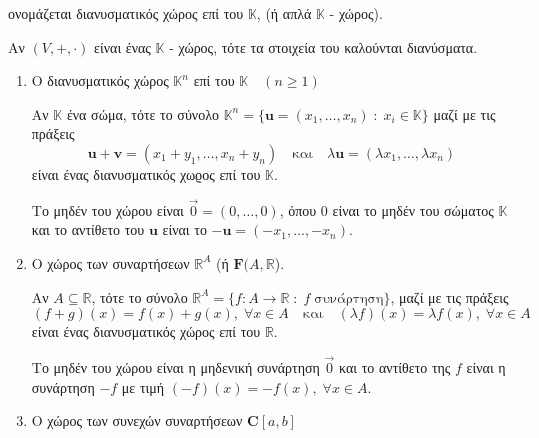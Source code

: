 \begin{dfn}
    ονομάζεται \textcolor{Col2}{διανυσματικός χώρος} επί του $\mathbb{K}$, 
    (ή απλά $ \mathbb{K} $ - χώρος).
\end{dfn}

\begin{dfn}
Αν $ (V,+,\cdot) $ είναι ένας $ \mathbb{K} $ - χώρος, τότε τα στοιχεία του καλούνται 
\textcolor{Col2}{διανύσματα}.
\end{dfn}


\begin{examples}
\item {}
    \begin{enumerate}
        \item \label{ex:Rn}\textcolor{Col2}{Ο διανυσματικός χώρος $ \mathbb{K}^{n} $ 
                επί του $ \mathbb{K} \quad (n \geq 1) $}

            Αν $ \mathbb{K} $ ένα σώμα, τότε το σύνολο $ \mathbb{K}^{n} = 
            \{ \mathbf{u} = (x_{1},\ldots,x_{n}) \; : \; x_{i} \in \mathbb{K}\} $ 
            μαζί με τις πράξεις 
            \[
                \mathbf{u}+ \mathbf{v} = (x_{1}+ y_{1}, \ldots , x_{n}+y_{n}) 
                \quad \text{και} \quad \lambda \mathbf{u} = 
                ( \lambda x_{1}, \ldots, \lambda x_{n})
            \]
            είναι ένας διανυσματικός χωϱος επί του $ \mathbb{K} $. 

            Το μηδέν του χώρου 
            είναι $ \vec{0} = (0,\ldots,0) $, όπου 0 είναι το μηδέν του σώματος 
            $ \mathbb{K} $ και το αντίθετο του $ \mathbf{u} $ είναι το $ - \mathbf{u} =
            (- x_{1}, \ldots, - x_{n}) $.

        \item\label{ex:funs} \textcolor{Col2}{Ο χώρος των συναρτήσεων $\mathbb{R} ^{A}$ 
            (ή $\mathbf{F}(A, \mathbb{R}$)}.

            Αν $ A \subseteq \mathbb{R} $, τότε το σύνολο $ \mathbb{R}^{A} = 
            \{ f \colon A \to \mathbb{R} \; : \; f \; \text{συνάρτηση} \} $, μαζί με 
            τις πράξεις
            \[
                (f+g)(x) = f(x) +g(x), \; \forall x \in A \quad \text{και} 
                \quad (\lambda f)(x)= \lambda f(x), \; \forall x \in A
            \] 
            είναι ένας διανυσματικός χώρος επί του $ \mathbb{R} $.

            Το μηδέν του χώρου είναι η μηδενική συνάρτηση $ \vec{0} $ και το 
            αντίθετο της $f$ είναι η συνάρτηση $ -f $ με τιμή $ (-f)(x) = 
            - f(x), \; \forall x \in A $.

        \item \textcolor{Col2}{Ο χώρος των συνεχών συναρτήσεων $ \mathbf{C}[a,b] $}


\end{enumerate}
\end{examples}
